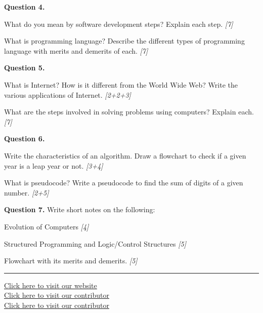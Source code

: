 \documentclass[11pt,a4paper]{article}
\newcommand{\pts}[1]{\hfill\textit{[#1]}}
\begin{document}
\medskip\noindent\textbf{Question 4.}
\begin{parts}
  \item What do you mean by software development steps? Explain each step. \pts{7}
  \item What is programming language? Describe the different types of programming language with merits and demerits of each. \pts{7}
\end{parts}

\medskip\noindent\textbf{Question 5.}
\begin{parts}
  \item What is Internet? How is it different from the World Wide Web? Write the various applications of Internet. \pts{2+2+3}
  \item What are the steps involved in solving problems using computers? Explain each. \pts{7}
\end{parts}

\medskip\noindent\textbf{Question 6.}
\begin{parts}
  \item Write the characteristics of an algorithm. Draw a flowchart to check if a given year is a leap year or not. \pts{3+4}
  \item What is pseudocode? Write a pseudocode to find the sum of digits of a given number. \pts{2+5}
\end{parts}

\medskip\noindent\textbf{Question 7.} Write short notes on the following:
\begin{parts}
  \item Evolution of Computers \pts{4}
  \item Structured Programming and Logic/Control Structures \pts{5}
  \item Flowchart with its merits and demerits. \pts{5}
\end{parts}

\vfill
\rule{\linewidth}{0.4pt}
\begin{center}\small
\href{https://bhu-exam.vercel.app/}{Click here to visit our website}\\[4pt]\href{https://me-aryan.vercel.app/}{Click here to visit our contributor}\\[4pt]\href{https://quashan-me.vercel.app/}{Click here to visit our contributor}
\end{center}
\end{document}
